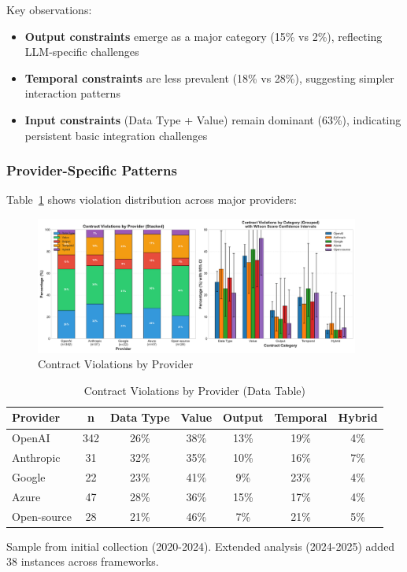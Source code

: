 \documentclass[11pt]{article}
\begin{document}
Key observations:
\begin{itemize}
    \item \textbf{Output constraints} emerge as a major category (15\% vs 2\%), reflecting LLM-specific challenges
    \item \textbf{Temporal constraints} are less prevalent (18\% vs 28\%), suggesting simpler interaction patterns
    \item \textbf{Input constraints} (Data Type + Value) remain dominant (63\%), indicating persistent basic integration challenges
\end{itemize}

\subsubsection{Provider-Specific Patterns}

Table~\ref{tab:provider_violations} shows violation distribution across major providers:

\begin{figure}[h]
\centering
\includegraphics[width=0.95\textwidth]{fig4_violations_by_provider.pdf}
\caption{Contract Violations by Provider}
\label{fig:provider_violations}
\end{figure}

\begin{table}[h]
\centering
\caption{Contract Violations by Provider (Data Table)}
\label{tab:provider_violations}
\begin{tabular}{lcccccc}
\toprule
\textbf{Provider} & \textbf{n} & \textbf{Data Type} & \textbf{Value} & \textbf{Output} & \textbf{Temporal} & \textbf{Hybrid} \\
\midrule
OpenAI & 342 & 26\% & 38\% & 13\% & 19\% & 4\% \\
Anthropic & 31 & 32\% & 35\% & 10\% & 16\% & 7\% \\
Google & 22 & 23\% & 41\% & 9\% & 23\% & 4\% \\
Azure & 47 & 28\% & 36\% & 15\% & 17\% & 4\% \\
Open-source & 28 & 21\% & 46\% & 7\% & 21\% & 5\% \\
\bottomrule
\end{tabular}
\vspace{0.1cm}
\footnotesize{Sample from initial collection (2020-2024). Extended analysis (2024-2025) added 38 instances across frameworks.}
\end{table}
\end{document}

